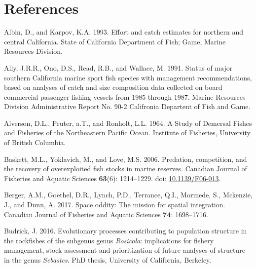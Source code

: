 \documentclass[11pt,
  english,
  a4paper,
]{article}
\newlength{\cslhangindent}
\newenvironment{CSLReferences}[2] %
 {%
  \setlength{\parindent}{0pt}
  \ifodd #1 \everypar{\setlength{\hangindent}{\cslhangindent}}\ignorespaces\fi
  \ifnum #2 > 0
  \setlength{\parskip}{#2\baselineskip}
  \fi
 }%
 {}
\begin{document}
\clearpage


\hypertarget{references}{%
\section{References}\label{references}}

\leavevmode\tagmcend\tagstructend

\hypertarget{refs}{}
\begin{CSLReferences}{1}{0}
\leavevmode{}%
Albin, D., and Karpov, K.A. 1993. {Effort and catch estimates for northern and central California}. State of California Department of Fish; Game, Marine Resources Division.

\leavevmode{}%
Ally, J.R.R., Ono, D.S., Read, R.B., and Wallace, M. 1991. {Status of major southern California marine sport fish species with management recommendations, based on analyses of catch and size composition data collected on board commercial passenger fishing vessels from 1985 through 1987}. Marine Resources Division Administrative Report No. 90-2 Califronia Departent of Fish and Game.

\leavevmode{}%
Alverson, D.L., Pruter, a.T., and Ronholt, L.L. 1964. {A Study of Demersal Fishes and Fisheries of the Northeastern Pacific Ocean}. Institute of Fisheries, University of British Columbia.

\leavevmode{}%
Baskett, M.L., Yoklavich, M., and Love, M.S. 2006. {Predation, competition, and the recovery of overexploited fish stocks in marine reserves}. Canadian Journal of Fisheries and Aquatic Sciences \textbf{63}(6): 1214--1229. doi: \href{https://doi.org/10.1139/F06-013}{10.1139/F06-013}.

\leavevmode{}%
Berger, A.M., Goethel, D.R., Lynch, P.D., Terrance, Q.I., Mormede, S., Mckenzie, J., and Dunn, A. 2017. {Space oddity: The mission for spatial integration}. Canadian Journal of Fisheries and Aquatic Sciences \textbf{74}: 1698--1716.

\leavevmode{}%
Budrick, J. 2016. {Evolutionary processes contributing to population structure in the rockfishes of the subgenus genus \emph{Rosicola}: implications for fishery management, stock assessment and prioritization of future analyses of structure in the genus \emph{Sebastes}.} PhD thesis, University of California, Berkeley.


\end{CSLReferences}
\end{document}
